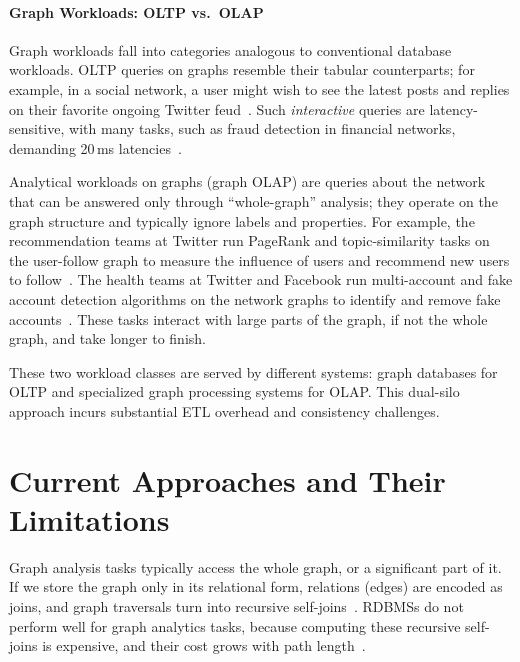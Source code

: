 \paragraph{Graph Workloads: OLTP vs.\ OLAP}
\label{sec:intro:workloads}

Graph workloads fall into categories analogous to conventional database workloads.
\ac{OLTP} queries on graphs resemble their tabular counterparts; for example, in a social network, a user might wish to see the latest posts and replies on their favorite ongoing Twitter feud~\cite{AholeMusk:online}.
Such \emph{interactive} queries are latency-sensitive, with many tasks, such as fraud detection in financial networks, demanding 20\,ms latencies~\cite{qiu2018real}.

Analytical workloads on graphs (graph \ac{OLAP}) are queries about the network that can be answered only through ``whole-graph'' analysis; they operate on the graph structure and typically ignore labels and properties.
For example, the recommendation teams at Twitter run PageRank and topic-similarity tasks on the user-follow graph to measure the influence of users and recommend new users to follow~\cite{tang2022taming}.
The health teams at Twitter and Facebook run multi-account and fake account detection algorithms on the network graphs to identify and remove fake accounts~\cite{breuer2020friend}.
These tasks interact with large parts of the graph, if not the whole graph, and take longer to finish.

These two workload classes are served by different systems: graph databases for OLTP and specialized graph processing systems for OLAP.
This dual-silo approach incurs substantial \ac{ETL} overhead and consistency challenges.

\section{Current Approaches and Their Limitations}
\label{sec:intro:approaches}

Graph analysis tasks typically access the whole graph, or a significant part of it.
If we store the graph only in its relational form, relations (edges) are encoded as joins, and graph traversals turn into recursive self-joins~\cite{10.1145/3129246}.
RDBMSs do not perform well for graph analytics tasks, because computing these recursive self-joins is expensive, and their cost grows with path length~\cite{TransitiveClosureBiskupStiefeling1989}.

